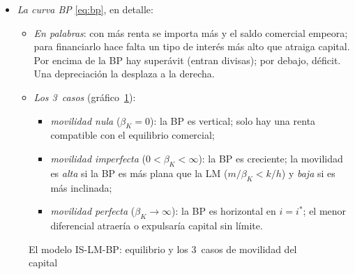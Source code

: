\documentclass[11pt]{article}
\begin{document}
\begin{itemize}
\item \emph{La curva BP} \eqref{eq:bp}, en detalle:
  \begin{itemize}
  \item \emph{En palabras}: con más renta se importa más y el saldo comercial empeora; para financiarlo hace falta un tipo de interés más alto que atraiga capital. Por encima de la BP hay superávit (entran divisas); por debajo, déficit. Una depreciación la desplaza a la derecha.
  \item \emph{Los 3~casos} (gráfico~\ref{fig:is-lm-bp}):
    \begin{itemize}
    \item \emph{movilidad nula} ($\beta_K=0$): la BP es vertical; solo hay una renta compatible con el equilibrio comercial;
    \item \emph{movilidad imperfecta} ($0<\beta_K<\infty$): la BP es creciente; la movilidad es \emph{alta} si la BP es más plana que la LM ($m/\beta_K<k/h$) y \emph{baja} si es más inclinada;
    \item \emph{movilidad perfecta} ($\beta_K\to\infty$): la BP es horizontal en $i=i^*$; el menor diferencial atraería o expulsaría capital sin límite.
    \end{itemize}
  \end{itemize}
\end{itemize}

\begin{figure}[H]
\centering
\caption{El modelo IS-LM-BP: equilibrio y los 3~casos de movilidad del capital}\label{fig:is-lm-bp}
\end{figure}
\end{document}
